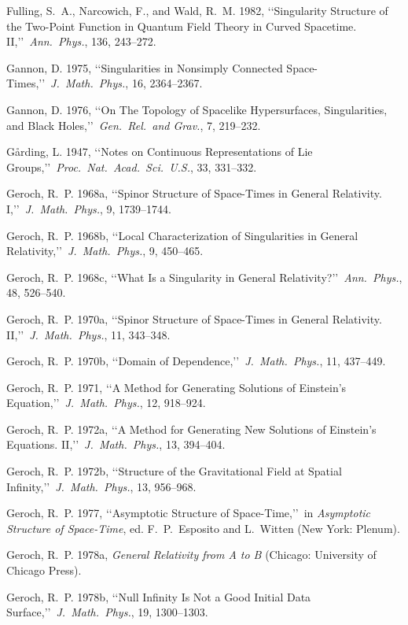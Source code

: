 \item Fulling, S.~A., Narcowich, F., and Wald, R.~M. 1982, \lq\lq Singularity Structure of the Two-Point Function in Quantum Field Theory in Curved Spacetime. II,\rq\rq\ \emph{Ann.\ Phys.}, 136, 243--272.
\item Gannon, D. 1975, \lq\lq Singularities in Nonsimply Connected Space-Times,\rq\rq\ \emph{J.\ Math.\ Phys.}, 16, 2364--2367.
\item Gannon, D. 1976, \lq\lq On The Topology of Spacelike Hypersurfaces, Singularities, and Black Holes,\rq\rq\ \emph{Gen.\ Rel.\ and Grav.}, 7, 219--232.
\item G{\aa}rding, L. 1947, \lq\lq Notes on Continuous Representations of Lie Groups,\rq\rq\ \emph{Proc.\ Nat.\ Acad.\ Sci.\ U.S.}, 33, 331--332.

\item Geroch, R.~P. 1968a, \lq\lq Spinor Structure of Space-Times in General Relativity. I,\rq\rq\ \emph{J.\ Math.\ Phys.}, 9, 1739--1744.
\item Geroch, R.~P. 1968b, \lq\lq Local Characterization of Singularities in General Relativity,\rq\rq\ \emph{J.\ Math.\ Phys.}, 9, 450--465.
\item Geroch, R.~P. 1968c, \lq\lq What Is a Singularity in General Relativity?\rq\rq\ \emph{Ann.\ Phys.}, 48, 526--540.
\item Geroch, R.~P. 1970a, \lq\lq Spinor Structure of Space-Times in General Relativity. II,\rq\rq\ \emph{J.\ Math.\ Phys.}, 11, 343--348.
\item Geroch, R.~P. 1970b, \lq\lq Domain of Dependence,\rq\rq\ \emph{J.\ Math.\ Phys.}, 11, 437--449.
\item Geroch, R.~P. 1971, \lq\lq A Method for Generating Solutions of Einstein's Equation,\rq\rq\ \emph{J.\ Math.\ Phys.}, 12, 918--924.
\item Geroch, R.~P. 1972a, \lq\lq A Method for Generating New Solutions of Einstein's Equations. II,\rq\rq\ \emph{J.\ Math.\ Phys.}, 13, 394--404.
\item Geroch, R.~P. 1972b, \lq\lq Structure of the Gravitational Field at Spatial Infinity,\rq\rq\ \emph{J.\ Math.\ Phys.}, 13, 956--968.
\item Geroch, R.~P. 1977, \lq\lq Asymptotic Structure of Space-Time,\rq\rq\ in \emph{Asymptotic Structure of Space-Time}, ed. F.~P.~Esposito and L.~Witten (New York: Plenum).
\item Geroch, R.~P. 1978a, \emph{General Relativity from A to B} (Chicago: University of Chicago Press).
\item Geroch, R.~P. 1978b, \lq\lq Null Infinity Is Not a Good Initial Data Surface,\rq\rq\ \emph{J.\ Math.\ Phys.}, 19, 1300--1303.

